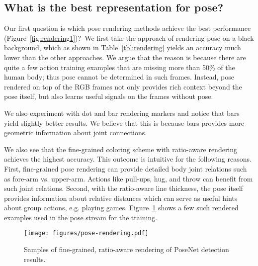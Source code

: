 \documentclass[10pt,twocolumn,letterpaper]{article}
\begin{document}
\subsection{What is the best representation for pose?}
\label{exp:pose_rendering}


Our first question is which pose rendering methods achieve the best performance (Figure~\ref{fig:rendering1})?\
We first take the approach of rendering pose on a black background, which as shown in Table~\ref{tbl:rendering} yields an accuracy much lower than the other approaches. 
We argue that the reason is because there are quite a few action training examples that are missing more than 50\% of the human body; thus pose cannot be determined in such frames. Instead, pose rendered on top of the RGB frames not only provides rich context beyond the pose itself, but also learns useful signals on the frames without pose. 

We also experiment with dot and bar rendering markers and notice that bars yield slightly better results.   We believe that this is because bars provides more geometric information about joint connections.

We also see that the fine-grained coloring scheme with ratio-aware rendering achieves the highest accuracy. This outcome is intuitive for the following reasons. First, fine-grained pose rendering can provide detailed body joint relations such as fore-arm vs. upper-arm. Actions like pull-ups, hug, and throw can benefit from such joint relations. Second, with the ratio-aware line thickness, the pose itself provides information about relative distances which can serve as useful hints about group actions, e.g. playing games. 
Figure~\ref{fig:posenet_rendering} shows a few such rendered examples used in the pose stream for the training.

\begin{figure}[!htb]
    \centering
    \texttt{[image: figures/pose-rendering.pdf]}
\caption{Samples of fine-grained, ratio-aware rendering of PoseNet detection results. }
\label{fig:posenet_rendering}
\vspace{-5mm}
\end{figure}
\end{document}
